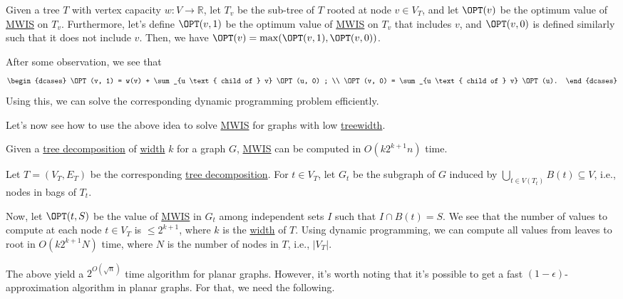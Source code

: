\begin{eg}
	Given a tree \(T\) with vertex capacity \(w\colon V \to \mathbb{R} \), let \(T_v\) be the sub-tree of \(T\) rooted at node \(v \in V_T\), and let \(\OPT(v)\) be the optimum value of \hyperref[prb:MWIS]{MWIS} on \(T_v\). Furthermore, let's define \(\OPT(v, 1)\) be the optimum value of \hyperref[prb:MWIS]{MWIS} on \(T_v\) that includes \(v\), and \(\OPT(v, 0)\) is defined similarly such that it does not include \(v\). Then, we have \(\OPT(v) = \max (\OPT(v, 1), \OPT(v, 0))\).

	After some observation, we see that
	\[
		\begin{dcases}
			\OPT(v, 1) = w(v) + \sum_{u \text{ child of } v} \OPT(u, 0) ; \\
			\OPT(v, 0) = \sum_{u \text{ child of } v} \OPT(u).
		\end{dcases}
	\]
	Using this, we can solve the corresponding dynamic programming problem efficiently.
\end{eg}

Let's now see how to use the above idea to solve \hyperref[prb:MWIS]{MWIS} for graphs with low \hyperref[def:treewidth]{treewidth}.

\begin{eg}\label{eg:MWIS-tree-decomposition}
	Given a \hyperref[def:tree-decomposition]{tree decomposition} of \hyperref[def:tree-decomposition-width]{width} \(k\) for a graph \(G\), \hyperref[prb:MWIS]{MWIS} can be computed in \(O(k 2^{k+1} n)\) time.
\end{eg}
\begin{explanation}
	Let \(T = (V_T, E_T)\) be the corresponding \hyperref[def:tree-decomposition]{tree decomposition}. For \(t \in V_T\), let \(G_t\) be the subgraph of \(G\) induced by \(\bigcup_{t \in V(T_t)} B(t) \subseteq V\), i.e., nodes in bags of \(T_t\).

	Now, let \(\OPT(t, S)\) be the value of \hyperref[prb:MWIS]{MWIS} in \(G_t\) among independent sets \(I\) such that \(I \cap B(t) = S\). We see that the number of values to compute at each node \(t \in V_T\) is \(\leq 2^{k+1}\), where \(k\) is the \hyperref[def:tree-decomposition-width]{width} of \(T\). Using dynamic programming, we can compute all values from leaves to root in \(O(k 2^{k+1} N)\) time, where \(N\) is the number of nodes in \(T\), i.e., \(\lvert V_T \rvert \).
\end{explanation}

The above yield a \(2^{O(\sqrt{n} )}\) time algorithm for planar graphs. However, it's worth noting that it's possible to get a fast \((1 - \epsilon )\)-approximation algorithm in planar graphs. For that, we need the following.


